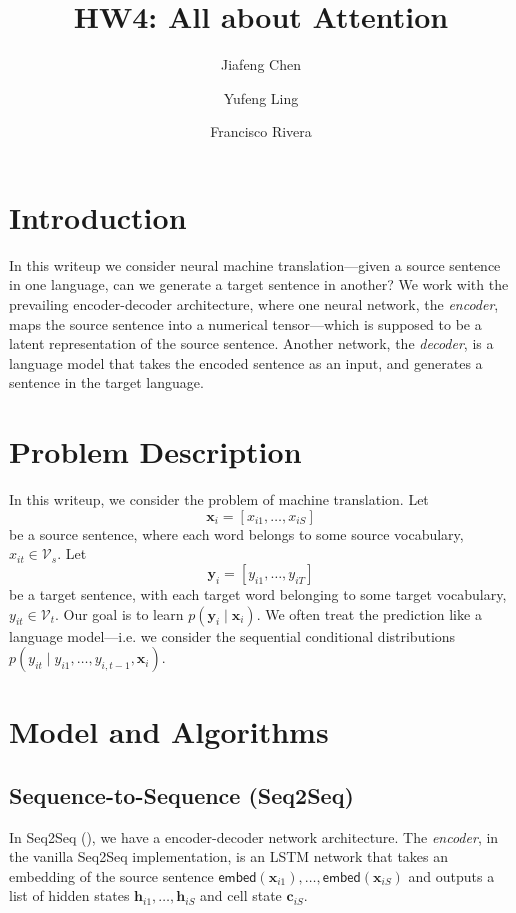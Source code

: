 \documentclass[12pt]{article}
\title{HW4: All about Attention}
\author{Jiafeng Chen \and Yufeng Ling \and
Francisco Rivera}
\newcommand{\sts}{Seq2Seq}
\newcommand{\embed}{\mathsf{embed}}
\begin{document}
\maketitle

\section{Introduction}
In this writeup we consider neural machine translation---given a source sentence in one language, can we generate a target sentence in another? We work with the prevailing encoder-decoder architecture, where one neural network, the \emph{encoder}, maps the source sentence into a numerical tensor---which is supposed to be a latent representation of the source sentence. Another network, the \emph{decoder}, is a language model that takes the encoded sentence as an input, and generates a sentence in the target language. 

\section{Problem Description}
In this writeup, we consider the problem of machine translation. Let 
\begin{equation}
	\bm x_i = [x_{i1},\ldots,x_{iS}]
\end{equation}
be a source sentence, where each word belongs to some source vocabulary, $x_{it} \in \mathcal V_s$. Let 
\begin{equation}
	\bm y_i = [y_{i1},\ldots,y_{iT}]
\end{equation}
be a target sentence, with each target word belonging to some target vocabulary, $y_{it} \in \mathcal V_t$. Our goal is to learn $p(\bm y_i \mid \bm x_i)$. We often treat the prediction like a language model---i.e. we consider the sequential conditional distributions $p(y_{it} \mid y_{i1},\ldots,y_{i,t-1}, \bm x_i)$.


\section{Model and Algorithms}

\subsection{Sequence-to-Sequence (\sts)}
\label{sub:seq2seq}
In \sts{} (\cite{sutskever2014sequence}), we have a encoder-decoder network architecture. The \emph{encoder}, in the vanilla \sts{} implementation, is an LSTM network that takes an embedding of the source sentence $\embed(\bm x_{i1}),\ldots,\embed(\bm x_{iS})$ and outputs a list of hidden states $\bm h_{i1},\ldots, \bm h_{iS}$ and cell state $\bm c_{iS}$.
\end{document}
